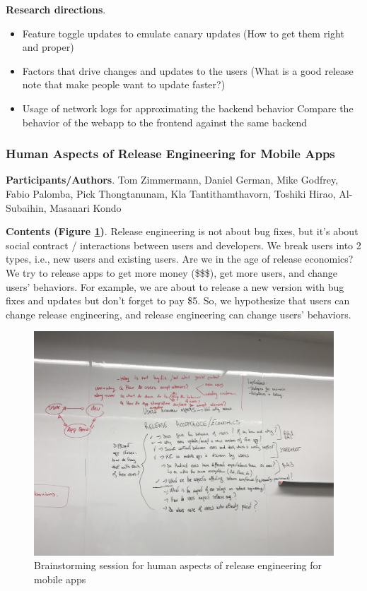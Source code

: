 \documentclass[a4paper]{article}
\newcommand{\smallsection}[1]{\noindent \textbf{#1}. }
\begin{document}
\smallsection{Research directions}
\begin{itemize}
    \tightlist
    \item Feature toggle updates to emulate canary updates (How to get them right and proper)
    \item Factors that drive changes and updates to the users (What is a good release note that make people want to update faster?)
    \item Usage of network logs for approximating the backend behavior Compare the behavior of the webapp to the frontend against the same backend
\end{itemize}


\subsubsection{Human Aspects of Release Engineering for Mobile Apps}

\smallsection{Participants/Authors}
Tom Zimmermann, Daniel German, Mike Godfrey, Fabio Palomba, Pick Thongtanunam, Kla Tantithamthavorn, Toshiki Hirao, Al-Subaihin, Masanari Kondo

\smallsection{Contents (Figure \ref{figHumanAspects})}
Release engineering is not about bug fixes, but it's about social contract / interactions between users and developers. We break users into 2 types, i.e., new users and existing users. Are we in the age of release economics? We try to release apps to get more money (\$\$\$), get more users, and change users' behaviors. For example, we are about to release a new version with bug fixes and updates but don't forget to pay \$5. So, we hypothesize that users can change release engineering, and release engineering can change users' behaviors.

\begin{figure}[h] \label{figHumanAspects}
  \centering
  \includegraphics[width=0.7\columnwidth]{fig/day1.jpg}
  \caption{Brainstorming session for human aspects of release engineering for mobile apps}
\end{figure}
\end{document}
